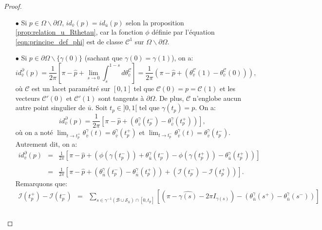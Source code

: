 \begin{proof}
    \begin{itemize}
        \item[$\bullet$] Si $p\in\Omega\backslash\partial\Omega$, $id_{\bar{v}}(p)=id_{\bar{u}}(p)$ selon la proposition \ref{prop:relation_u_Rthetau}, car la fonction $\phi$ définie par l'équation \eqref{eqn:principe_def_phi} est de classe $\mathcal{C}^1$ sur $\Omega\backslash\partial\Omega$.\\
        \item[$\bullet$] Si $p\in\partial\Omega\backslash\{\gamma(0)\}$ (sachant que $\gamma(0)=\gamma(1)$), on a:
        $$
        id^\partial_{\bar{v}}(p)=\frac{1}{2\pi}\left[\pi-\widehat{p}+\displaystyle\lim\limits_{s\rightarrow 0}\int_s^{1-s}d\theta_{\bar{v}}^{\mathcal{C}}\right]=\frac{1}{2\pi}\left(\pi-\widehat{p}+(\theta_{\bar{v}}^{\mathcal{C}}(1)-\theta_{\bar{v}}^{\mathcal{C}}(0))\right),
        $$
        où $\mathcal{C}$ est un lacet paramétré sur $[0, 1]$ tel que $\mathcal{C}(0)=p=\mathcal{C}(1)$ et les vecteurs $\mathcal{C}'(0)$ et $\mathcal{C}'(1)$ sont tangents à $\partial\Omega$. De plus, $\mathcal{C}$ n'englobe aucun autre point singulier de $\bar{u}$. Soit $t_p\in]0, 1[$ tel que $\gamma(t_p)=p$. On a:
        $$
        id^\partial_{\bar{v}}(p)=\frac{1}{2\pi}\left[\pi-\widehat{p}+\left(\theta_{\bar{v}}^\gamma(t_p^-)-\theta_{\bar{v}}^\gamma(t_p^+)\right)\right],
        $$
        où on a noté $\lim_{t\rightarrow t_p^+}\theta^\gamma_{\bar{v}}(t)=\theta^\gamma_{\bar{v}}(t_p^+)$ et $\lim_{t\rightarrow t_p^-}\theta^\gamma_{\bar{v}}(t)=\theta_{\bar{v}}^\gamma(t_p^-)$. Autrement dit, on a:
        $$
        \begin{array}{lcl}
        id^\partial_{\bar{v}}(p)&=&\displaystyle\frac{1}{2\pi}\left[\pi-\widehat{p}+\left(\phi(\gamma(t_p^-))+\theta_{\bar{u}}^\gamma(t_p^-)-\phi(\gamma(t_p^+))-\theta_{\bar{u}}^\gamma(t_p^+)\right)\right]\\\\
        &=&\displaystyle\frac{1}{2\pi}\left[\pi-\widehat{p}+\left(\theta_{\bar{n}}^\gamma(t_p^-)-\theta_{\bar{n}}^\gamma(t_p^+)\right)+\left(\mathcal{I}(t_p^-)-\mathcal{I}(t_p^+)\right)\right].
        \end{array}
        $$
        Remarquons que:
        \begin{eqnarray*}
            \mathcal{I}(t_p^+)-\mathcal{I}(t_p^-)&=&\sum_{s\in\gamma^{-1}(\mathcal{B}\cup\mathcal{S}_{\bar{n}})\cap[0, t_p]}\left[\left(\pi-\widehat{\gamma(s)}-2\pi I_{\gamma(s)}\right)-\left(\theta^{\gamma}_{\bar{n}}(s^+) - \theta^{\gamma}_{\bar{n}}(s^-)\right)\right]\\\\

\end{eqnarray*}
\end{itemize}
\end{proof}
